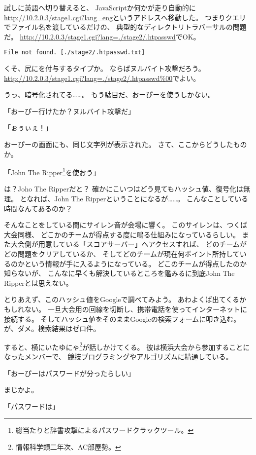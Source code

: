 試しに英語へ切り替えると、
JavaScriptか何かが走り自動的に
\url{http://10.2.0.3/stage1.cgi?lang=eng}というアドレスへ移動した。
つまりクエリでファイル名を渡しているだけの、
典型的なディレクトリトラバーサルの問題だ。
\url{http://10.2.0.3/stage1.cgi?lang=./stage2/.htpasswd}でOK。

\begin{lstlisting}
File not found. [./stage2/.htpasswd.txt]
\end{lstlisting}

くそ、尻にを付与するタイプか。
ならばヌルバイト攻撃だろう。
\url{http://10.2.0.3/stage1.cgi?lang=./stage2/.htpasswd%00}でよい。



うっ、暗号化されてる……。
もう駄目だ、おーぴーを使うしかない。

「おーぴー行けたか？ヌルバイト攻撃だ」

「ぉぅぃぇ！」

おーぴーの画面にも、同じ文字列が表示された。
さて、ここからどうしたものか。

「John The Ripper\footnote{総当たりと辞書攻撃によるパスワードクラックツール。}を使おう」

は？Joho The Ripperだと？
確かにこいつはどう見てもハッシュ値、復号化は無理。
となれば、John The Ripperということになるが……。
こんなことしている時間なんてあるのか？

そんなことをしている間にサイレン音が会場に響く。
このサイレンは、つくば大会同様、
どこかのチームが得点する度に鳴る仕組みになっているらしい。
また大会側が用意している「スコアサーバー」へアクセスすれば、
どのチームがどの問題をクリアしているか、
そしてどのチームが現在何ポイント所持しているのかという情報が手に入るようになっている。
どこのチームが得点したのか知らないが、
こんなに早くも解決しているところを鑑みるに到底John The Ripperとは思えない。

とりあえず、このハッシュ値をGoogleで調べてみよう。
あわよくば出てくるかもしれない。
一旦大会用の回線を切断し、携帯電話を使ってインターネットに接続する。
そしてハッシュ値をそのままGoogleの検索フォームに叩き込む。
が、ダメ。検索結果はゼロ件。

すると、横にいたゆにゃ\footnote{情報科学類二年次、AC部屋勢。}が話しかけてくる。
彼は横浜大会から参加することになったメンバーで、
競技プログラミングやアルゴリズムに精通している。

「おーぴーはパスワードが分ったらしい」

まじかよ。

「パスワードは」

